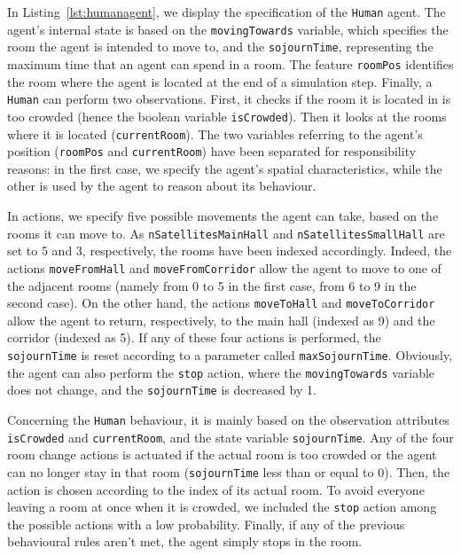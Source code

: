 \documentclass[runningheads]{llncs}
\begin{document}
In Listing~\ref{lst:humanagent}, we display the specification of the \lstinline{Human} agent.
%
The agent's internal state is based on the \lstinline{movingTowards} variable, which specifies the room the agent is intended to move to, and the \lstinline{sojournTime}, representing the maximum time that an agent can spend in a room.
%
The feature \lstinline{roomPos} identifies the room where the agent is located at the end of a simulation step.
%
Finally, a \lstinline{Human} can perform two observations. First, it checks if the room it is located in is too crowded (hence the boolean variable \lstinline{isCrowded}). Then it looks at the rooms where it is located (\lstinline{currentRoom}).
%
The two variables referring to the agent's position (\lstinline{roomPos} and \lstinline{currentRoom}) have been separated for responsibility reasons: in the first case, we specify the agent's spatial characteristics, while the other is used by the agent to reason about its behaviour.

In actions, we specify five possible movements the agent can take, based on the rooms it can move to.
%
As \lstinline{nSatellitesMainHall} and \lstinline{nSatellitesSmallHall} are set to 5 and 3, respectively, the rooms have been indexed accordingly.
%
Indeed, the actions \lstinline{moveFromHall} and \lstinline{moveFromCorridor} allow the agent to move to one of the adjacent rooms (namely from 0 to 5 in the first case, from 6 to 9 in the second case).
%
On the other hand, the actions \lstinline{moveToHall} and \lstinline{moveToCorridor} allow the agent to return, respectively, to the main hall (indexed as 9) and the corridor (indexed as 5).
%
If any of these four actions is performed, the \lstinline{sojournTime} is reset according to a parameter called \lstinline{maxSojournTime}.
%
Obviously, the agent can also perform the \lstinline{stop} action, where the \lstinline{movingTowards} variable does not change, and the \lstinline{sojournTime} is decreased by 1.

Concerning the \lstinline{Human} behaviour, it is mainly based on the observation attributes \lstinline{isCrowded} and \lstinline{currentRoom}, and the state variable \lstinline{sojournTime}.
%
Any of the four room change actions is actuated if the actual room is too crowded or the agent can no longer stay in that room (\lstinline{sojournTime} less than or equal to 0). Then, the action is chosen according to the index of its actual room.
%
To avoid everyone leaving a room at once when it is crowded, we included the \lstinline{stop} action among the possible actions with a low probability.
%
Finally, if any of the previous behavioural rules aren't met, the agent simply stops in the room.
\end{document}
